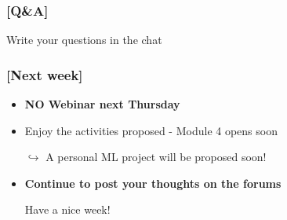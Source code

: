 \documentclass[xcolor=x11names,compress, aspectratio=169]{beamer}
\renewcommand{\(}{\begin{columns}}
\renewcommand{\)}{\end{columns}}
\newcommand{\<}[1]{\begin{column}{#1}}
\renewcommand{\>}{\end{column}}
\begin{document}
\begin{frame} %
\frametitle{\textcolor{brique}{[Q\&A]}}
\begin{center}
\Large \textcolor{siap}{ Write your questions in the chat}
\end{center}
\end{frame}

\begin{frame} %
\frametitle{\textcolor{brique}{[Next week]}}
\pause
\begin{itemize}[<+->]
    \item \textbf{NO Webinar next Thursday}
    \item Enjoy the activities proposed - Module 4 opens soon
    \item[$\hookrightarrow$] A personal ML  project will be proposed soon!
    \item \textbf{Continue to post your thoughts on the forums}
    \item[] \begin{center}
                \Large \textcolor{siap}{ Have a nice week!}
            \end{center}
\end{itemize}
\end{frame}
\end{document}

